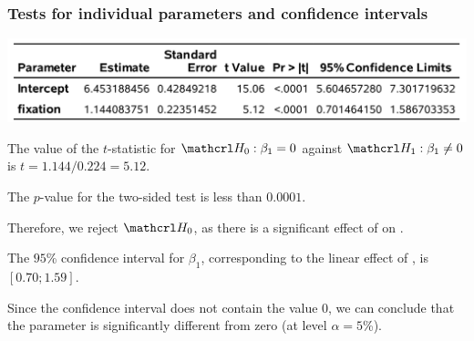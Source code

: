 \documentclass{beamer}
\begin{document}
 

\begin{frame}
\frametitle{Tests for individual parameters and confidence intervals}

\begin{center}
\includegraphics[width=0.9\linewidth]{img/c2/slides3-e11}
\end{center}
\bi
\item The value of the $t$-statistic for $\Hy_0: \beta_1=0$ against $\Hy_1:\beta_1 \neq 0$ is $t=1.144/0.224=5.12$.
\item The $p$-value for the two-sided test is less than $0.0001$.
\item Therefore, we reject $\Hy_0$, as there is a significant  effect of  on .
\item The $95$\% confidence interval for $\beta_1$, corresponding to the linear effect of , is $[0.70; 1.59]$. 
\item Since the confidence interval does not contain the value $0$, we can conclude that the parameter is significantly different from  zero (at level $\alpha=5$\%).
\ei
\end{frame}
% 
\end{document}
